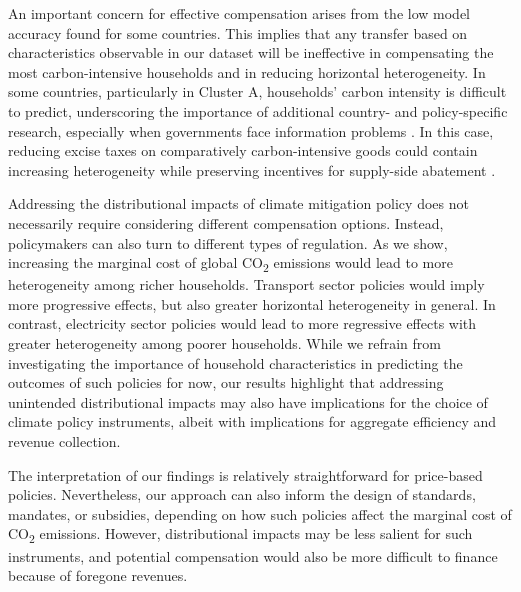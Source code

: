 \documentclass[12pt, a4paper]{article}
\begin{document}
An important concern for effective compensation arises from the low model accuracy found for some countries. This implies that any transfer based on characteristics observable in our dataset will be ineffective in compensating the most carbon-intensive households and in reducing horizontal heterogeneity. In some countries, particularly in Cluster A, households' carbon intensity is difficult to predict, underscoring the importance of additional country- and policy-specific research, especially when governments face information problems \autocite{Mirrlees.1971}. In this case, reducing excise taxes on comparatively carbon-intensive goods could contain increasing heterogeneity while preserving incentives for supply-side abatement \autocite{Goulder.2008}.

Addressing the distributional impacts of climate mitigation policy does not necessarily require considering different compensation options. Instead, policymakers can also turn to different types of regulation. As we show, increasing the marginal cost of global CO\textsubscript{2} emissions would lead to more heterogeneity among richer households. Transport sector policies would imply more progressive effects, but also greater horizontal heterogeneity in general. In contrast, electricity sector policies would lead to more regressive effects with greater heterogeneity among poorer households. While we refrain from investigating the importance of household characteristics in predicting the outcomes of such policies for now, our results highlight that addressing unintended distributional impacts may also have implications for the choice of climate policy instruments, albeit with implications for aggregate efficiency and revenue collection. 

The interpretation of our findings is relatively straightforward for price-based policies. Nevertheless, our approach can also inform the design of standards, mandates, or subsidies, depending on how such policies affect the marginal cost of CO\textsubscript{2} emissions. However, distributional impacts may be less salient for such instruments, and potential compensation would also be more difficult to finance because of foregone revenues. %
\end{document}
